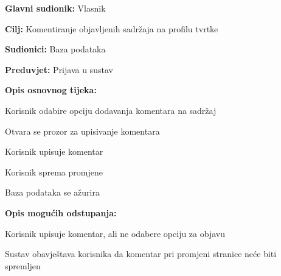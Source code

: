 				
				\noindent {}
				\begin{packed_item}
					
					\item \textbf{Glavni sudionik: } Vlasnik
					\item  \textbf{Cilj:} Komentiranje objavljenih sadržaja na profilu tvrtke
					\item  \textbf{Sudionici:} Baza podataka
					\item  \textbf{Preduvjet:} Prijava u sustav
					\item  \textbf{Opis osnovnog tijeka:}
					
					\item[] \begin{packed_enum}
						
						\item Korisnik odabire opciju dodavanja komentara na sadržaj
						\item Otvara se prozor za upisivanje komentara
						\item Korisnik upisuje komentar
						\item Korisnik sprema promjene
						\item Baza podataka se ažurira
					\end{packed_enum}
					
					\item  \textbf{Opis mogućih odstupanja:}
					
					\item[] \begin{packed_item}
						
						\item[3.a] Korisnik upisuje komentar, ali ne odabere opciju za objavu
						\item[] \begin{packed_enum}
							
							\item Sustav obavještava korisnika da komentar pri promjeni stranice neće biti spremljen
							
						\end{packed_enum}
						
					\end{packed_item}
				\end{packed_item}
				
